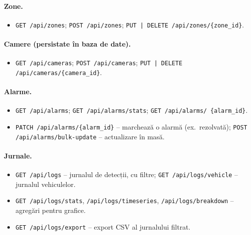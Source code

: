 \documentclass[../../main.tex]{subfiles}
\begin{document}
\paragraph*{Zone.}
\begin{itemize}
    \item \texttt{GET /api/zones}; \texttt{POST /api/zones}; \texttt{PUT\,|\,DELETE /api/zones/\linebreak \{zone\_id\}}.
\end{itemize}

\paragraph*{Camere (persistate în baza de date).}
\begin{itemize}
    \item \texttt{GET /api/cameras}; \texttt{POST /api/cameras}; \texttt{PUT\,|\,DELETE /api/cameras/\linebreak \{camera\_id\}}.
\end{itemize}

\paragraph*{Alarme.}
\begin{itemize}
    \item \texttt{GET /api/alarms}; \texttt{GET /api/alarms/stats}; \texttt{GET /api/alarms/ \linebreak \{alarm\_id\}}.
    \item \texttt{PATCH /api/alarms/\{alarm\_id\}} -- marchează o alarmă (ex.\ rezolvată); \texttt{POST /api/alarms/bulk-update} -- actualizare în masă.
\end{itemize}

\paragraph*{Jurnale.}
\begin{itemize}
    \item \texttt{GET /api/logs} -- jurnalul de detecții, cu filtre; \texttt{GET /api/logs/vehicle} -- jurnalul vehiculelor.
    \item \texttt{GET /api/logs/stats}, \texttt{/api/logs/timeseries}, \texttt{/api/logs/breakdown} -- agregări pentru grafice.
    \item \texttt{GET /api/logs/export} -- export CSV al jurnalului filtrat.
\end{itemize}
\end{document}
